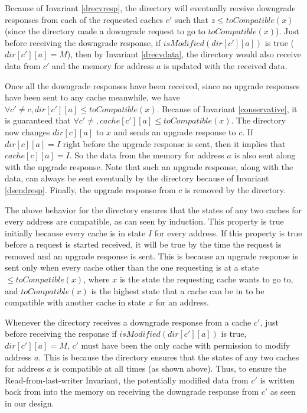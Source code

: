 Because of Invariant \ref{drecvresp}, the directory will eventually receive
downgrade responses  from each of the requested caches $c'$
such that $z \le toCompatible(x)$ (since the directory made a downgrade request
to go to $toCompatible(x)$). Just before receiving the downgrade response, if
$isModified(dir[c'][a])$ is true (\ie $dir[c'][a] = M$), then by Invariant
\ref{drecvdata}, the directory would also receive data from $c'$ and the memory
for address $a$ is updated with the received data.

Once all the downgrade responses have been received, since no upgrade responses
have been sent to any cache meanwhile, we have $\forall c' \neq c, dir[c'][a] \le
toCompatible(x)$. Because of Invariant \ref{conservative}, it is guaranteed that
$\forall c' \neq, cache[c'][a] \le toCompatible(x)$. The directory now changes
$dir[c][a]$ to $x$ and sends an upgrade response  to $c$. If
$dir[c][a] = I$ right before the upgrade response is sent, then it implies that
$cache[c][a] = I$. So the data from the memory for address $a$ is also sent
along with the upgrade response. Note that such an upgrade response, along with
the data, can always be sent eventually by the directory because of Invariant
\ref{dsendresp}. Finally, the upgrade response from $c$ is removed by the
directory.

The above behavior for the directory ensures that the states of any two caches
for every address are compatible, as can seen by induction.  This property is
true initially because every cache is in state $I$ for every address. If this
property is true before a request is started received, it will be true by the
time the request is removed and an upgrade response is sent. This is because an
upgrade response is sent only when every cache other than the one requesting is
at a state $\le toCompatible(x)$, where $x$ is the state the requesting cache
wants to go to, and $toCompatible(x)$ is the highest state that a cache can be
in to be compatible with another cache in state $x$ for an address.

Whenever the directory receives a downgrade response from a cache $c'$, just
before receiving the response if $isModified(dir[c'][a])$ is true, \ie
$dir[c'][a] = M$, $c'$ must have been the only cache with permission to modify
address $a$. This is because the directory ensures that the states of any two
caches for address $a$ is compatible at all times (as shown above). Thus, to
ensure the Read-from-last-writer Invariant, the potentially modified data from
$c'$ is written back from into the memory on receiving the downgrade response
from $c'$ as seen in our design.

